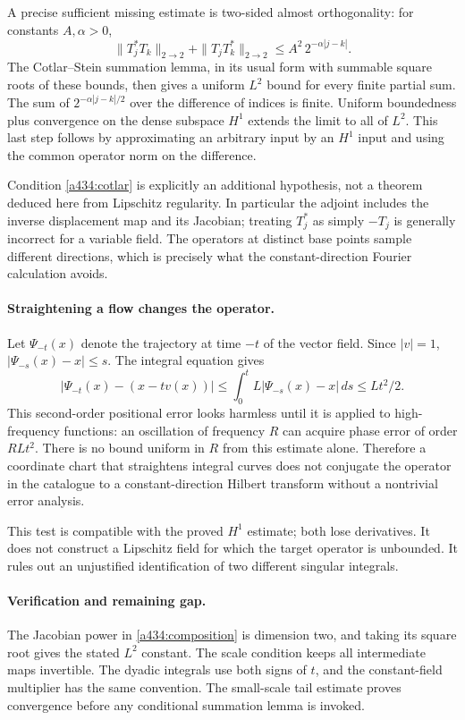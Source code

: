 \documentclass[11pt]{article}
\begin{document}
A precise sufficient missing estimate is two-sided
almost orthogonality: for constants $A,\alpha>0$,
\begin{equation}\label{a434:cotlar}
 \|T_j^*T_k\|_{2\to2}+\|T_jT_k^*\|_{2\to2}
                         \leq A^2\,2^{-\alpha|j-k|}.
\end{equation}
The Cotlar--Stein summation lemma, in its usual form with
summable square roots of these bounds, then gives a
uniform $L^2$ bound for every finite partial sum. The
sum of $2^{-\alpha|j-k|/2}$ over the difference of
indices is finite. Uniform boundedness plus convergence
on the dense subspace $H^1$ extends the limit to all
of $L^2$. This last step follows by approximating an
arbitrary input by an $H^1$ input and using the common
operator norm on the difference.

Condition \eqref{a434:cotlar} is explicitly an additional
hypothesis, not a theorem deduced here from Lipschitz
regularity. In particular the adjoint includes the
inverse displacement map and its Jacobian; treating
$T_j^*$ as simply $-T_j$ is generally incorrect for a
variable field. The operators at distinct base points
sample different directions, which is precisely what
the constant-direction Fourier calculation avoids.

\paragraph{Straightening a flow changes the operator.}
Let $\Psi_{-t}(x)$ denote the trajectory at time $-t$
of the vector field. Since $|v|=1$,
$|\Psi_{-s}(x)-x|\leq s$. The integral equation gives
\[
 |\Psi_{-t}(x)-(x-tv(x))|
 \leq\int_0^t L|\Psi_{-s}(x)-x|\,ds
 \leq Lt^2/2.
\]
This second-order positional error looks harmless
until it is applied to high-frequency functions:
an oscillation of frequency $R$ can acquire phase
error of order $RLt^2$. There is no bound uniform
in $R$ from this estimate alone. Therefore a
coordinate chart that straightens integral curves
does not conjugate the operator in the catalogue
to a constant-direction Hilbert transform without
a nontrivial error analysis.

This test is compatible with the proved $H^1$
estimate; both lose derivatives. It does not
construct a Lipschitz field for which the target
operator is unbounded. It rules out an unjustified
identification of two different singular integrals.

\paragraph{Verification and remaining gap.}
The Jacobian power in \eqref{a434:composition} is
dimension two, and taking its square root gives
the stated $L^2$ constant. The scale condition
keeps all intermediate maps invertible. The
dyadic integrals use both signs of $t$, and the
constant-field multiplier has the same convention.
The small-scale tail estimate proves convergence
before any conditional summation lemma is invoked.
\end{document}
